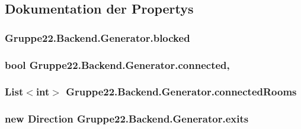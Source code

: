 \subsection{Dokumentation der Propertys}
\hypertarget{class_gruppe22_1_1_backend_1_1_generator_ae8a5091874b204ac692ce85ec56b495a}{
\subsubsection[{blocked}]{ Gruppe22.\-Backend.\-Generator.\-blocked\hspace{0.3cm}{\ttfamily [get]}}}\label{class_gruppe22_1_1_backend_1_1_generator_ae8a5091874b204ac692ce85ec56b495a}
\hypertarget{class_gruppe22_1_1_backend_1_1_generator_a78432433649cd8d0c4f2dc1c49c6821f}{
\subsubsection[{connected}]{\setlength{\rightskip}{0pt plus 5cm}bool Gruppe22.\-Backend.\-Generator.\-connected\hspace{0.3cm}{\ttfamily [get]}, {\ttfamily [set]}}}\label{class_gruppe22_1_1_backend_1_1_generator_a78432433649cd8d0c4f2dc1c49c6821f}
\hypertarget{class_gruppe22_1_1_backend_1_1_generator_a4d4db744aab453a9ad1317fc280f80a0}{
\subsubsection[{connected\-Rooms}]{\setlength{\rightskip}{0pt plus 5cm}List$<$int$>$ Gruppe22.\-Backend.\-Generator.\-connected\-Rooms\hspace{0.3cm}{\ttfamily [get]}}}\label{class_gruppe22_1_1_backend_1_1_generator_a4d4db744aab453a9ad1317fc280f80a0}
\hypertarget{class_gruppe22_1_1_backend_1_1_generator_a08c85796fec36eaf888e0c2d8af5cb64}{
\subsubsection[{exits}]{\setlength{\rightskip}{0pt plus 5cm}new {\bf Direction} Gruppe22.\-Backend.\-Generator.\-exits\hspace{0.3cm}{\ttfamily [get]}}}\label{class_gruppe22_1_1_backend_1_1_generator_a08c85796fec36eaf888e0c2d8af5cb64}
